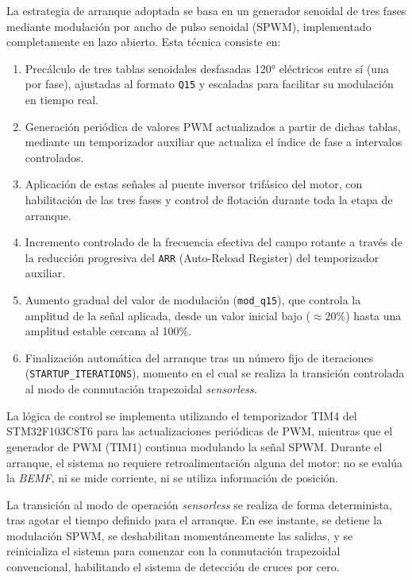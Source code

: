 La estrategia de arranque adoptada se basa en un generador senoidal de tres fases mediante modulación por ancho de pulso senoidal (SPWM), implementado completamente en lazo abierto. Esta técnica consiste en:

\begin{enumerate}
    \item Precálculo de tres tablas senoidales desfasadas 120° eléctricos entre sí (una por fase), ajustadas al formato \texttt{Q15} y escaladas para facilitar su modulación en tiempo real.
    \item Generación periódica de valores PWM actualizados a partir de dichas tablas, mediante un temporizador auxiliar que actualiza el índice de fase a intervalos controlados.
    \item Aplicación de estas señales al puente inversor trifásico del motor, con habilitación de las tres fases y control de flotación durante toda la etapa de arranque.
    \item Incremento controlado de la frecuencia efectiva del campo rotante a través de la reducción progresiva del \texttt{ARR} (Auto-Reload Register) del temporizador auxiliar.
    \item Aumento gradual del valor de modulación (\texttt{mod\_q15}), que controla la amplitud de la señal aplicada, desde un valor inicial bajo ($\approx 20\%$) hasta una amplitud estable cercana al 100\%.
    \item Finalización automática del arranque tras un número fijo de iteraciones (\texttt{STARTUP\_ITERATIONS}), momento en el cual se realiza la transición controlada al modo de conmutación trapezoidal \textit{sensorless}.
\end{enumerate}

La lógica de control se implementa utilizando el temporizador TIM4 del STM32F103C8T6 para las actualizaciones periódicas de PWM, mientras que el generador de PWM (TIM1) continua modulando la señal SPWM. Durante el arranque, el sistema no requiere retroalimentación alguna del motor: no se evalúa la \textit{BEMF}, ni se mide corriente, ni se utiliza información de posición.

La transición al modo de operación \textit{sensorless} se realiza de forma determinista, tras agotar el tiempo definido para el arranque. En ese instante, se detiene la modulación SPWM, se deshabilitan momentáneamente las salidas, y se reinicializa el sistema para comenzar con la conmutación trapezoidal convencional, habilitando el sistema de detección de cruces por cero.

